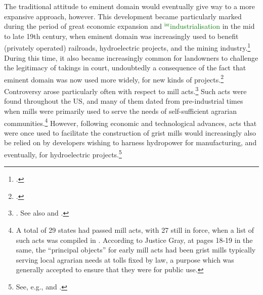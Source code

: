 \documentclass[12pt,a4paper]{book} %
\newcommand{\isr}[1]{\textcolor{green}{$^{\textrm{isr}}${#1}}}
\begin{document}

The traditional attitude to eminent domain would eventually give way to a more expansive approach, however. This development became particularly marked during the period of great economic expansion and \isr{industrialisation} in the mid to late 19th century, when eminent domain was increasingly used to benefit (privately operated) railroads, hydroelectric projects, and the mining industry.\footcite[23-33]{meidinger80} During this time, it also became increasingly common for landowners to challenge the legitimacy of takings in court, undoubtedly a consequence of the fact that eminent domain was now used more widely, for new kinds of projects.\footcite[24]{meidinger80} Controversy arose particularly often with respect to mill acts.\footnote{\cite[24]{meidinger80}. See also \cite[306-313]{johnson11} and \cite[251-252]{horwitz73}.} Such acts were found throughout the US, and many of them dated from pre-industrial times when mills were primarily used to serve the needs of self-sufficient agrarian communities.\footnote{A total of 29 states had passed mill acts, with 27 still in force, when a list of such acts was compiled in \cite[17]{head85}. According to Justice Gray, at pages 18-19 in the same, the ``principal objects'' for early mill acts had been grist mills typically serving local agrarian needs at tolls fixed by law, a purpose which was generally accepted to ensure that they were for public use.}  However, following economic and technological advances, acts that were once used to facilitate the construction of grist mills would increasingly also be relied on by developers wishing to harness hydropower for manufacturing, and eventually, for hydroelectric projects.\footnote{See, e.g., \cite[18-21]{head85} and \cite[449-452]{minn06}.}
\end{document}
